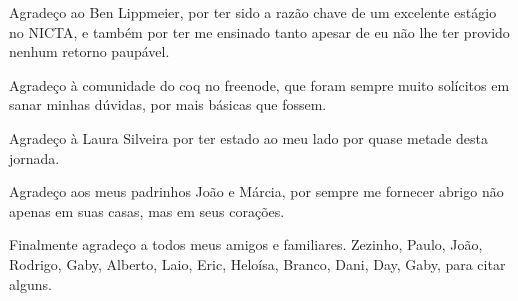 \documentclass[bacharelado]{unb-cic}
\theoremstyle{definition}
\theoremstyle{definition}
\begin{document}
\begin{agradecimentos}
    Agradeço ao Ben Lippmeier, por ter sido a razão chave de um excelente estágio
    no NICTA, e também por ter me ensinado tanto apesar de eu não lhe ter provido nenhum retorno paupável. 

    Agradeço à comunidade do coq no freenode, que foram sempre muito solícitos em
    sanar minhas dúvidas, por mais básicas que fossem.

    Agradeço à Laura Silveira por ter estado ao meu lado por quase metade desta jornada.

    Agradeço aos meus padrinhos João e Márcia, por sempre me fornecer abrigo não apenas em suas casas, mas em seus corações.

    Finalmente agradeço a todos meus amigos e familiares. Zezinho, Paulo, 
    João, Rodrigo, Gaby, Alberto, Laio, Eric, Heloísa, Branco, Dani, Day, Gaby, para citar alguns.
  \end{agradecimentos}


  
  \tableofcontents
  \printglossary
  \listoffigures
  \listoftables

  \textual    
  
  
  
  
  
  


  \postextual
  
  
\end{document}
